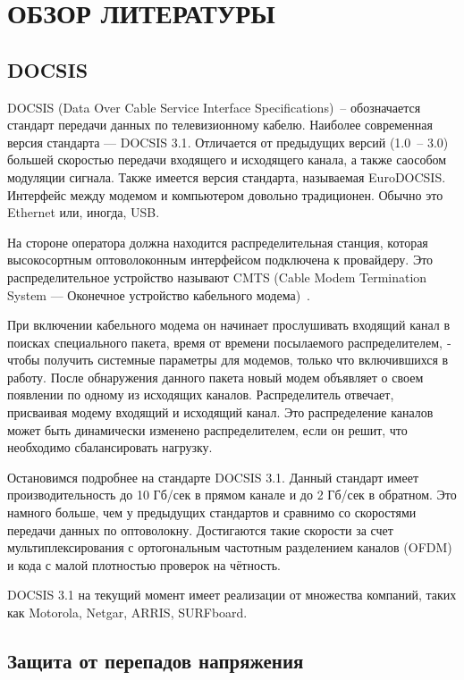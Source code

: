 \section{ОБЗОР ЛИТЕРАТУРЫ}
\label{sec:domain}

\subsection{DOCSIS}

DOCSIS (Data Over Cable Service Interface Specifications)~-- обозначается стандарт передачи данных по телевизионному кабелю. 
Наиболее современная версия стандарта — DOCSIS 3.1\cite{DOCSIS_tech}. Отличается от предыдущих версий (1.0~-- 3.0) большей скоростью передачи
входящего и исходящего канала, а также саособом модуляции сигнала. Также имеется версия стандарта,
называемая EuroDOCSIS. Интерфейс между модемом и компьютером довольно традиционен. Обычно это
Ethernet или, иногда, USB. 

На стороне оператора должна находится распределительная станция, которая 
высокосортным оптоволоконным интерфейсом подключена к провайдеру. Это 
распределительное устройство называют CMTS (Cable Modem Termination System —
Оконечное устройство кабельного модема)~\cite{computer_networks}. 

При включении кабельного модема он начинает прослушивать входящий канал
в поисках специального пакета, время от времени посылаемого распределителем,
­чтобы получить системные параметры для модемов, только что включившихся
в ра­боту. После обнаружения данного пакета новый модем объявляет о своем появлении 
по одному из исходящих каналов. Распределитель отвечает, присваивая
модему входящий и исходящий канал. Это распределение каналов может быть динамически 
изменено распределителем, если он решит, что необходимо сбалансировать нагрузку.

Остановимся подробнее на стандарте DOCSIS 3.1. Данный стандарт имеет производительность до 10 Гб/сек в прямом канале и до 2 Гб/сек в обратном. 
Это намного больше, чем у предыдущих стандартов и сравнимо со скоростями передачи данных по оптоволокну. Достигаются такие скорости 
за счет мультиплексирования с ортогональным частотным разделением каналов (OFDM) и кода с малой плотностью проверок на чётность.

DOCSIS 3.1 на текущий момент имеет реализации от множества компаний, таких как Motorola, Netgar, ARRIS, SURFboard.

\subsection{Защита от перепадов напряжения}

